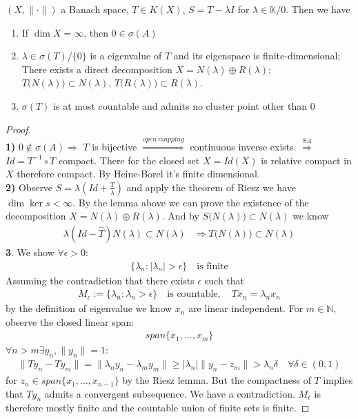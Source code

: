 \begin{theorem}
	$(X, \|\cdot\|)$ a Banach space, $T \in K(X)$, $S = T - \lambda I$ for $\lambda \in \mathbb{K} \slash 0$. Then we have
	\begin{enumerate}
		\item If $\dim X = \infty$, then $0 \in \sigma(A)$
		\item $\lambda \in \sigma (T)\slash \{0\}$ is a eigenvalue of $T$ and its eigenspace is finite-dimensional; There exists a direct decomposition $X = N(\lambda) \oplus R(\lambda)$; $T\big(N(\lambda)\big) \subset N(\lambda)$, $T\big(R(\lambda)\big) \subset R(\lambda)$.
		\item $\sigma(T)$ is at most countable and admits no cluster point other than $0$
	\end{enumerate}
\end{theorem}
\begin{proof}\quad\\
\textbf{1)}	$0 \notin \sigma(A) \Rightarrow$ $T$ is bijective
	 $\overset{open\ mapping}{\Rightarrow}$ continuous inverse exists. 
	 $\overset{8.4}{\Rightarrow}$	$Id= T^{-1} \circ T$ compact. There for the closed set $X = Id(X)$ is relative compact in $X$ therefore compact. By Heine-Borel it's finite dimensional.\\
\textbf{2)}
Observe $S = \lambda(Id + \frac{T}{\lambda})$ and apply the theorem of Riesz we have $\dim \ker s < \infty$. By the lemma above we can prove the existence of the decomposition $X = N(\lambda) \oplus R(\lambda)$.  And by $S\big(N(\lambda)\big) \subset N(\lambda)$ we know
\begin{align*}
	\lambda(Id - \hat{T})N(\lambda) \subset N(\lambda) & \Rightarrow T\big(N(\lambda)\big) \subset N(\lambda)
\end{align*}
\textbf{3}. We show $\forall \epsilon > 0$:
\begin{align*}
	\{\lambda_n : |\lambda_n| > \epsilon \} \quad \text{is finite}
\end{align*}
Assuming the contradiction that there exists $\epsilon$ such that 
\begin{align*}
	M_\epsilon := \{\lambda_n: \lambda_n > \epsilon\} \quad \text{is countable}, \quad Tx_n = \lambda_n x_n
\end{align*}
by the definition of eigenvalue we know $x_n$ are linear independent. For $m \in \mathbb{N}$, observe the closed linear span:
\begin{align*}
	span\{x_1, \dots, x_m\}
\end{align*}
$\forall n > m \exists y_n, \|y_n\| = 1: $ 
\begin{align*}
	\|Ty_n - Ty_m\| = \|\lambda_n y_n - \lambda_m y_m\| \geq |\lambda_n|\|y_n - z_m\| > \lambda_n \delta \quad \forall \delta \in (0, 1)
\end{align*}
for $z_n \in span\{x_1, \dots, x_{n-1}\}$ by the Riesz lemma. But the compactness of $T$ implies that $Ty_n$ admits a convergent subsequence. We have a contradiction. $M_\epsilon$ is therefore mostly finite and the countable union of finite sets is finite.
\end{proof}



